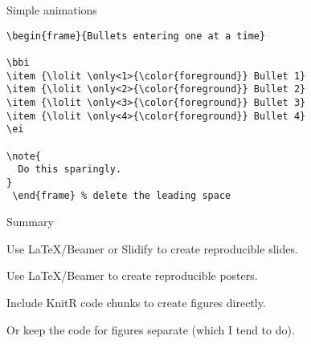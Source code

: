 \documentclass[12pt,t]{beamer}
\begin{document}
\begin{frame}[c,fragile]{Simple animations}

\begin{lstlisting}
\begin{frame}{Bullets entering one at a time}

\bbi
\item {\lolit \only<1>{\color{foreground}} Bullet 1}
\item {\lolit \only<2>{\color{foreground}} Bullet 2}
\item {\lolit \only<3>{\color{foreground}} Bullet 3}
\item {\lolit \only<4>{\color{foreground}} Bullet 4}
\ei

\note{
  Do this sparingly.
}
 \end{frame} % delete the leading space
\end{lstlisting}

\end{frame}


\begin{frame}{Summary}

\bbi
\item Use LaTeX/Beamer or Slidify to create reproducible slides.
\item Use LaTeX/Beamer to create reproducible posters.
\item Include KnitR code chunks to create figures directly.
\item Or keep the code for figures separate (which I tend to do).
\ei

\end{frame}
\end{document}
